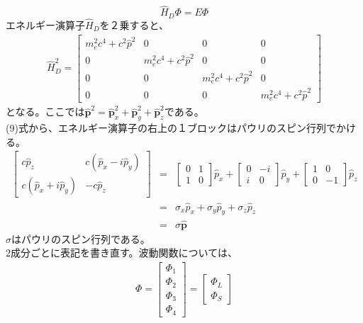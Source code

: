 \documentclass[10pt]{jreport}
\begin{document}
\begin{equation}
\hat{H}_D \Phi = E \Phi
\end{equation}
エネルギー演算子$\hat{H}_D$を２乗すると、
\begin{eqnarray}
\hat{H}_D^2 = \left [
\begin{array}{cccc}
m_e^2 c^4+c^2\hat{p}^2 & 0 & 0 & 0 \\
0& m_e^2 c^4+c^2\hat{p}^2 & 0 & 0 \\
0 & 0 & m_e^2c^4+c^2\hat{p}^2 & 0 \\
0 & 0 & 0 & m_e^2c^4+c^2\hat{p}^2 
\end{array}
\right ]
\end{eqnarray}
となる。ここでは$\hat{\textbf{p}}^2=\hat{\textbf{p}}_x^2+\hat{\textbf{p}}_y^2+\hat{\textbf{p}}_z^2$である。\\
(9)式から、エネルギー演算子の右上の１ブロックはパウリのスピン行列でかける。
\begin{eqnarray}
\left [
\begin{array}{rr}
c\hat{p}_z & c(\hat{p}_x-i\hat{p}_y) \\
c(\hat{p}_x+i\hat{p}_y) & -c\hat{p}_z 
\end{array}
\right ] &=& \left [
\begin{array}{rr}
0 & 1 \\
1 & 0 
\end{array}
\right ] \hat{p}_x + \left [
\begin{array}{rr}
0 & -i \\
i &0 
\end {array}
\right ] \hat{p}_y +\left [
\begin{array}{rr}
1 & 0 \\
0 & -1 
\end{array}
\right ] \hat{p}_z \nonumber \\
&=& \sigma_x \hat{p}_x + \sigma_{y}\hat{p}_y +\sigma_{z}\hat{p}_z \nonumber \\
&=& \sigma \hat{\textbf{p}}
\end{eqnarray} 
$\sigma$はパウリのスピン行列である。\\
2成分ごとに表記を書き直す。波動関数については、
\begin{eqnarray}
\Phi = \left [
\begin{array}{r}
\Phi_1 \\
\Phi_2 \\
\Phi_3 \\
\Phi_4
\end{array}
\right ] = \left [
\begin{array}{r}
\Phi_L \\
\Phi_S 
\end{array} 
\right ] \nonumber
\end{eqnarray}
\end{document}
